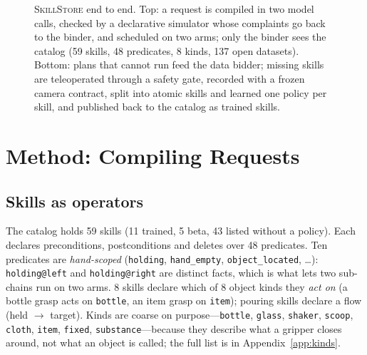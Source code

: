\documentclass[10pt,twocolumn,letterpaper]{article}
\newcommand{\sys}{\textsc{SkillStore}}
\newcommand{\code}[1]{\texttt{\small #1}}
\begin{document}
\begin{figure}[t]
\caption{\sys{} end to end. Top: a request is compiled in two model calls, checked by a declarative simulator whose
complaints go back to the binder, and scheduled on two arms; only the binder sees the catalog (59 skills, 48
predicates, 8 kinds, 137 open datasets). Bottom: plans that cannot run feed the data bidder; missing skills are
teleoperated through a safety gate, recorded with a frozen camera contract, split into atomic skills and learned one
policy per skill, and published back to the catalog as trained skills.}
\label{fig:system}
\end{figure}

\section{Method: Compiling Requests}
\subsection{Skills as operators}
The catalog holds 59 skills (11 trained, 5 beta, 43 listed without a policy). Each declares preconditions,
postconditions and deletes over 48 predicates. Ten predicates are \emph{hand-scoped} (\code{holding},
\code{hand\_empty}, \code{object\_located}, \ldots): \code{holding@left} and \code{holding@right} are distinct facts,
which is what lets two sub-chains run on two arms. 8 skills declare which of 8 object kinds they \emph{act on} (a
bottle grasp acts on \code{bottle}, an item grasp on \code{item}); pouring skills declare a flow (held $\to$ target).
Kinds are coarse on purpose---\code{bottle}, \code{glass}, \code{shaker}, \code{scoop}, \code{cloth}, \code{item},
\code{fixed}, \code{substance}---because they describe what a gripper closes around, not what an object is called;
the full list is in Appendix~\ref{app:kinds}.
\end{document}
